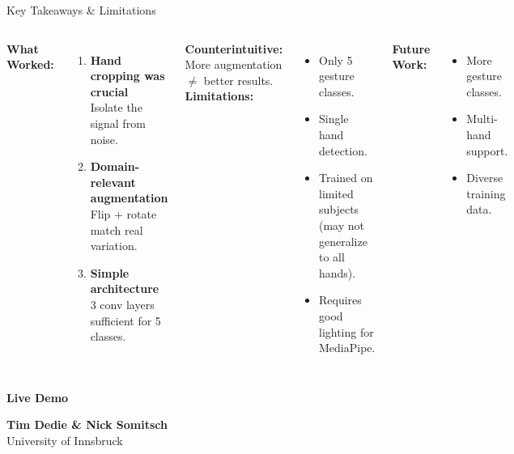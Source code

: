 \documentclass[aspectratio=169, 10pt]{beamer}
\begin{document}
\begin{frame}{Key Takeaways \& Limitations}
    \begin{columns}[T, onlytextwidth]
            \textbf{What Worked:}
            \begin{enumerate}
                \item \textbf{Hand cropping was crucial} \\ \footnotesize Isolate the signal from noise.
                \item \textbf{Domain-relevant augmentation} \\ \footnotesize Flip + rotate match real variation.
                \item \textbf{Simple architecture} \\ \footnotesize 3 conv layers sufficient for 5 classes.
            \end{enumerate}

            \vspace{0.3cm}
            \textbf{Counterintuitive:}
            More augmentation $\neq$ better results.
            \textbf{Limitations:}
            \begin{itemize}
                \item Only 5 gesture classes.
                \item Single hand detection.
                \item Trained on limited subjects (may not generalize to all hands).
                \item Requires good lighting for MediaPipe.
            \end{itemize}

            \vspace{0.3cm}
            \textbf{Future Work:}
            \begin{itemize}
                \item More gesture classes.
                \item Multi-hand support.
                \item Diverse training data.
            \end{itemize}
    \end{columns}
\end{frame}

{
\begin{frame}
    \color{white}
    \centering

    \vspace{2.5cm}
    {\Huge \textbf{Live Demo}}

    \vspace{2.5cm}
    \textbf{Tim Dedie \& Nick Somitsch} \\
    University of Innsbruck
\end{frame}
}
\end{document}
